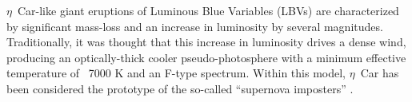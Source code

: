 






$\eta$~Car-like giant eruptions of Luminous Blue Variables (LBVs) are
characterized by significant mass-loss and an increase in luminosity
by several magnitudes\cite{Humphreys94,Humphreys99}.
Traditionally, it was thought
that this increase in luminosity 
drives a dense wind, producing an
optically-thick cooler pseudo-photosphere with a minimum effective
temperature of ~7000 K and an F-type spectrum\cite{Davidson87}.  Within
this model, $\eta$~Car has been considered the prototype of the
so-called ``supernova imposters''
\cite{Goodrich89,Humphreys94,Humphreys99,VanDyk00,Vink09,Kashi10_ngc300}.

